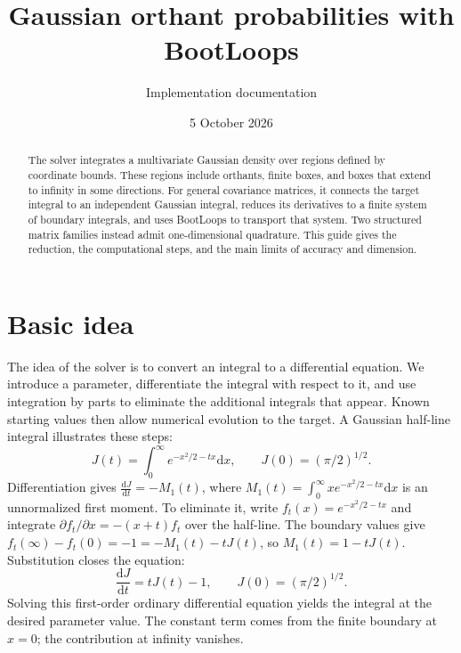 \documentclass[aps,pra,onecolumn,11pt,tightenlines,notitlepage,nofootinbib]{revtex4-2}
\newcommand{\dd}{\mathrm{d}}
\begin{document}
\raggedbottom
\title{Gaussian orthant probabilities with BootLoops}
\author{Implementation documentation}
\noaffiliation
\date{5 October 2026}
\begin{abstract}
The solver integrates a multivariate Gaussian density over regions defined
by coordinate bounds. These regions include orthants, finite boxes, and
boxes that extend to infinity in some directions. For general covariance
matrices, it connects the target integral to
an independent Gaussian integral, reduces its derivatives to a finite system
of boundary integrals, and uses BootLoops to transport that system. Two
structured matrix families instead admit one-dimensional quadrature. This
guide gives the reduction, the computational steps, and the main limits of
accuracy and dimension.
\end{abstract}
\maketitle

\section{Basic idea}
The idea of the solver is to convert an integral to a differential equation.
We introduce a parameter, differentiate the integral with respect to it,
and use integration by parts to eliminate the additional integrals that
appear. Known starting values then allow numerical evolution to the target.
A Gaussian half-line integral illustrates these steps:
\begin{equation}
 J(t)=\int_0^\infty e^{-x^2/2-tx}\dd x,
 \qquad J(0)=(\pi/2)^{1/2}.
 \label{eq:toy-integral}
\end{equation}
Differentiation gives $\frac{\dd J}{\dd t}=-M_1(t)$, where
$M_1(t)=\int_0^\infty x e^{-x^2/2-tx}\dd x$ is an unnormalized first
moment. To eliminate it, write $f_t(x)=e^{-x^2/2-tx}$ and integrate
$\partial f_t/\partial x=-(x+t)f_t$ over the half-line. The boundary values give
$f_t(\infty)-f_t(0)=-1=-M_1(t)-tJ(t)$, so $M_1(t)=1-tJ(t)$.
Substitution closes the equation:
\begin{equation}
 \frac{\dd J}{\dd t}=tJ(t)-1,\qquad J(0)=(\pi/2)^{1/2}.
 \label{eq:toy-equation}
\end{equation}
Solving this first-order ordinary differential equation yields the integral
at the desired parameter value. The constant term comes from the finite
boundary at $x=0$; the contribution at infinity vanishes.
\end{document}
